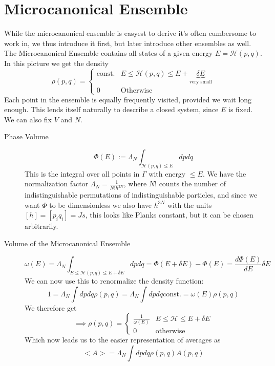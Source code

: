 \documentclass{report}
\begin{document}
\section{Microcanonical Ensemble}
While the microcanonical ensemble is easyest to derive it's often cumbersome to work in, we thus introduce it first, but later introduce other ensembles as well.\\
The Microcanonical Ensemble contains all states of a given energy $E = \mathcal{H}\left( p,q \right) $. In this picture we get the density \[
  \rho\left( p, q \right) = \begin{cases}
    \text{const.} & E\le \mathcal{H}\left( p,q \right) \le E + \underbrace{\delta E}_{\text{very small}} \\
    0 & \text{Otherwise}
  \end{cases}
\] 
Each point in the ensemble is equally frequently visited, provided we wait long enough. This lends itself naturally to describe a closed system, since $E$ is fixed. We can also fix $V$ and $N$.\\
\begin{description}
  \item[Phase Volume] \[
      \Phi\left( E \right) := \Lambda_N \int_{\mathcal{H}\left( p,q \right) \le E} dp dq
    \] This is the integral over all points in $\Gamma$ with energy $\le  E$. We have the normalization factor $\Lambda_N = \frac{1}{N! h^{3N}}$, where $N!$ counts the number of indistinguishable permutations of indistinguishable particles, and since we want $\Phi$ to be dimensionless we also have $h^{3N}$ with the units $[h] = [p_i q_i] = Js$, this looks like Planks constant, but it can be chosen arbitrarily.
  \item[Volume of the Microcanonical Ensemble] \[
      \omega\left( E \right) = \Lambda_N \int_{E \le \mathcal{H}\left( p,q \right) \le E + \delta E} dp dq = \Phi\left( E + \delta E \right) - \Phi\left( E \right) = \frac{d\Phi\left( E \right) }{dE} \delta E
  \] We can now use this to renormalize the density function: \[
  1 = \Lambda_N \int dp dq \rho\left( p,q \right) = \Lambda_N \int dp dq \text{const.} = \omega\left( E \right) \rho\left( p,q \right) 
  \] We therefore get \[
  \implies \rho\left( p,q \right) = \begin{cases}
    \frac{1}{\omega\left( E \right) } & E\le  \mathcal{H} \le E + \delta E\\
    0 & \text{otherwise}
  \end{cases}
  \] Which now leads us to the easier representation of averages as \[
  <A> = \Lambda_N \int dp dq \rho(p,q) A\left( p,q \right) 
  \] 
\end{description}
\end{document}
